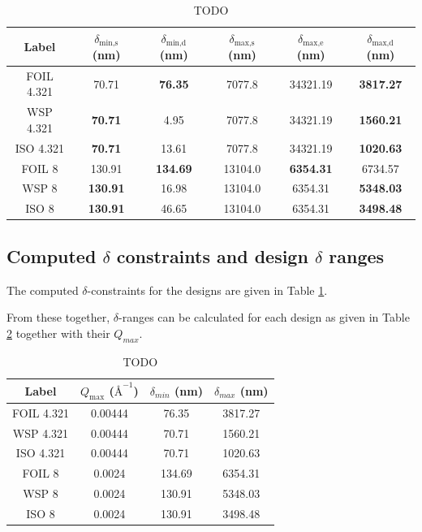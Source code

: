 \documentclass{article}
\begin{document}
\begin{table}[h!]
	\centering
	\begin{tabular}{c c c c c c}
		\toprule
		Label & $\delta_{\text{min,s}}$ (nm) & $\delta_{\text{min,d}}$ (nm) & $\delta_{\text{max,s}}$ (nm) & $\delta_{\text{max,e}}$ (nm) & $\delta_{\text{max,d}}$ (nm) \\
		\midrule
		FOIL 4.321 & 70.71 & \textbf{76.35} & 7077.8 & 34321.19 & \textbf{3817.27} \\
		WSP 4.321 & \textbf{70.71} & 4.95 & 7077.8 & 34321.19 & \textbf{1560.21} \\
		ISO 4.321 & \textbf{70.71} & 13.61 & 7077.8 & 34321.19 & \textbf{1020.63} \\
		FOIL 8 & 130.91 & \textbf{134.69} & 13104.0 & \textbf{6354.31} & 6734.57 \\
		WSP 8 & \textbf{130.91} & 16.98 & 13104.0 & 6354.31 & \textbf{5348.03} \\
		ISO 8 & \textbf{130.91} & 46.65 & 13104.0 & 6354.31 & \textbf{3498.48} \\
		\bottomrule
	\end{tabular}
	\caption{TODO}
	\label{tab:designs-delta-constraints}
\end{table}
\subsection{Computed $\delta$ constraints and design $\delta$ ranges}
\label{c4.2}
The computed $\delta$-constraints for the designs are given in Table \ref{tab:designs-delta-constraints}.

From these together, $\delta$-ranges can be calculated for each design as given in Table \ref{tab:designs-final-ranges} together with their $Q_{max}$.
\begin{table}[h!]
	\centering
	\begin{tabular}{c c c c}
		\toprule
		Label & $Q_{\text{max}}$ ($\text{\AA}^{-1}$) & $\delta_{min}$ (nm) & $\delta_{max}$ (nm) \\
		\midrule
		FOIL 4.321 & 0.00444 & 76.35 & 3817.27 \\
		WSP 4.321 & 0.00444 & 70.71 & 1560.21 \\
		ISO 4.321 & 0.00444 & 70.71 & 1020.63 \\
		FOIL 8 & 0.0024 & 134.69 & 6354.31 \\
		WSP 8 & 0.0024 & 130.91 & 5348.03 \\
		ISO 8 & 0.0024 & 130.91 & 3498.48 \\
		\bottomrule
	\end{tabular}
	\caption{TODO}
	\label{tab:designs-final-ranges}
\end{table}
\end{document}
